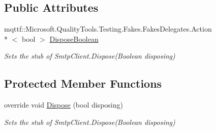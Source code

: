 \subsection*{Public Attributes}
\begin{DoxyCompactItemize}
\item 
mqttf\-::\-Microsoft.\-Quality\-Tools.\-Testing.\-Fakes.\-Fakes\-Delegates.\-Action\\*
$<$ bool $>$ \hyperlink{class_system_1_1_net_1_1_mail_1_1_fakes_1_1_stub_smtp_client_a4b68aee8229976b9765abcfa3d5519e1}{Dispose\-Boolean}
\begin{DoxyCompactList}\small\item\em Sets the stub of Smtp\-Client.\-Dispose(\-Boolean disposing)\end{DoxyCompactList}\end{DoxyCompactItemize}
\subsection*{Protected Member Functions}
\begin{DoxyCompactItemize}
\item 
override void \hyperlink{class_system_1_1_net_1_1_mail_1_1_fakes_1_1_stub_smtp_client_add2d7d4d1728cc293fe1b3d0006c86d3}{Dispose} (bool disposing)
\begin{DoxyCompactList}\small\item\em Sets the stub of Smtp\-Client.\-Dispose(\-Boolean disposing)\end{DoxyCompactList}\end{DoxyCompactItemize}
